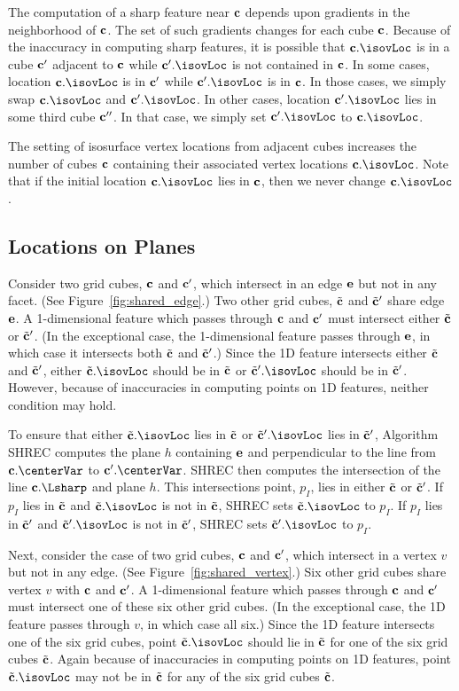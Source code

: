 The computation of a sharp feature near $\mathbf{c}$ depends
upon gradients in the neighborhood of $\mathbf{c}$.
The set of such gradients changes for each cube $\mathbf{c}$.
Because of the inaccuracy in computing sharp features,
it is possible that $\cb.\isovLoc$ is in a cube $\mathbf{c}'$ adjacent to $\mathbf{c}$
while $\cb'.\isovLoc$ is not contained in $\mathbf{c}$.
In some cases,
location $\cb.\isovLoc$ is in $\mathbf{c}'$ while $\cb'.\isovLoc$ is in $\mathbf{c}$.
In those cases,
we simply swap $\cb.\isovLoc$ and $\cb'.\isovLoc$.
In other cases, location $\cb'.\isovLoc$ lies in some third cube $\mathbf{c}''$.
In that case, we simply set $\cb'.\isovLoc$ to $\cb.\isovLoc$.

The setting of isosurface vertex locations from adjacent cubes
increases the number of cubes $\mathbf{c}$ containing 
their associated vertex locations $\cb.\isovLoc$.
Note that if the initial location $\cb.\isovLoc$ lies in $\mathbf{c}$,
then we never change $\cb.\isovLoc$.


\subsection{Locations on Planes}

Consider two grid cubes, $\mathbf{c}$ and $\mathbf{c}'$, 
which intersect in an edge $\mathbf{e}$ but not in any facet.
(See Figure~\ref{fig:shared_edge}.)
Two other grid cubes, ${\tilde{\mathbf{c}}}$ and ${\tilde{\mathbf{c}}}'$ share edge $\mathbf{e}$.
A 1-dimensional feature which passes through $\mathbf{c}$ and $\mathbf{c}'$ must intersect
either ${\tilde{\mathbf{c}}}$ or ${\tilde{\mathbf{c}}}'$.
(In the exceptional case, the 1-dimensional feature passes through $\mathbf{e}$,
in which case it intersects both ${\tilde{\mathbf{c}}}$ and ${\tilde{\mathbf{c}}}'$.)
Since the 1D feature intersects either ${\tilde{\mathbf{c}}}$ and ${\tilde{\mathbf{c}}}'$,
either $\tcb.\isovLoc$ should be in ${\tilde{\mathbf{c}}}$ 
or $\tcb'.\isovLoc$ should be in ${\tilde{\mathbf{c}}}'$.
However, because of inaccuracies in computing points on 1D features,
neither condition may hold.

To ensure that either $\tcb.\isovLoc$ lies in ${\tilde{\mathbf{c}}}$
or $\tcb'.\isovLoc$ lies in ${\tilde{\mathbf{c}}}'$,
Algorithm SHREC computes the plane $h$ containing $\mathbf{e}$
and perpendicular to the line from $\cb.\centerVar$ to $\cb'.\centerVar$.
SHREC then computes the intersection of the line $\cb.\Lsharp$ 
and plane $h$.
This intersections point, $p_I$, lies in either ${\tilde{\mathbf{c}}}$ or ${\tilde{\mathbf{c}}}'$.
If $p_I$ lies in ${\tilde{\mathbf{c}}}$ and $\tcb.\isovLoc$ is not in ${\tilde{\mathbf{c}}}$,
SHREC sets $\tcb.\isovLoc$ to $p_I$.
If $p_I$ lies in ${\tilde{\mathbf{c}}}'$ and $\tcb'.\isovLoc$ is not in ${\tilde{\mathbf{c}}}'$,
SHREC sets $\tcb'.\isovLoc$ to $p_I$.

Next, consider the case of two grid cubes, $\mathbf{c}$ and $\mathbf{c}'$, 
which intersect in a vertex $v$ but not in any edge.
(See Figure~\ref{fig:shared_vertex}.)
Six other grid cubes share vertex $v$ with $\mathbf{c}$ and $\mathbf{c}'$.
A 1-dimensional feature which passes through $\mathbf{c}$ and $\mathbf{c}'$ must intersect
one of these six other grid cubes.
(In the exceptional case, the 1D feature passes through $v$,
in which case all six.)
Since the 1D feature intersects one of the six grid cubes,
point $\tcb.\isovLoc$ should lie in ${\tilde{\mathbf{c}}}$ for one of the six grid cubes ${\tilde{\mathbf{c}}}$.
Again because of inaccuracies in computing points on 1D features,
point $\tcb.\isovLoc$ may not be in ${\tilde{\mathbf{c}}}$ for any of the six grid cubes ${\tilde{\mathbf{c}}}$.

